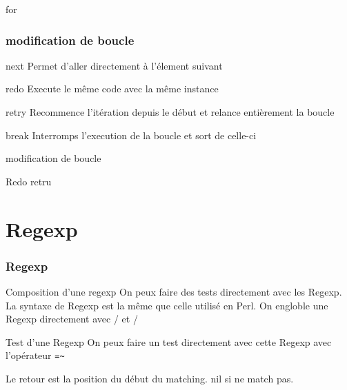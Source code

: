 \documentclass{beamer}
\begin{document}
\begin{frame}
  \begin{block}{for}
    
  \end{block}
\end{frame}

\begin{frame}
  \frametitle{modification de boucle}
  \begin{block}{next}
    Permet d'aller directement à l'\'element suivant
  \end{block}
  \begin{block}{redo}
    Execute le même code avec la même instance
  \end{block}
  \begin{block}{retry}
    Recommence l'it\'eration depuis le d\'ebut et relance entièrement la boucle
  \end{block}
  \begin{block}{break}
    Interromps l'execution de la boucle et sort de celle-ci
  \end{block}
\end{frame}

\begin{frame}
  \begin{block}{modification de boucle}
    
  \end{block}
\end{frame}

\begin{frame}
  \begin{block}{Redo retru}
    
  \end{block}
\end{frame}

\section{Regexp}

\begin{frame}
  \frametitle{Regexp}
  \begin{block}{Composition d'une regexp}
    On peux faire des tests directement avec les Regexp. La syntaxe de Regexp est la même que celle
    utilis\'e en Perl. On engloble une Regexp directement avec / et /
  \end{block}
  \begin{block}{Test d'une Regexp}
    On peux faire un test directement avec cette Regexp avec l'op\'erateur \verb?=~?

    Le retour est la position du d\'ebut du matching. nil si ne match pas.
  \end{block}
\end{frame}
\end{document}
